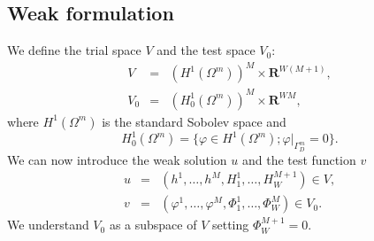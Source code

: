 \documentclass{elsarticle}
\newcommand{\R}{\mathbf{R}}
\begin{document}
\subsection{Weak formulation}
We define the trial space $V$ and the test space $V_0$:
\begin{eqnarray} \label{eqn:spaces}
  V &=& \left(H^1(\Omega^m)\right)^M\times\R^{W(M+1)}, \\
  V_0 &=& \left(H^1_0(\Omega^m)\right)^M\times\R^{WM},
\end{eqnarray}
where $H^1(\Omega^m)$ is the standard Sobolev space and 
\[ H^1_0(\Omega^m)=\{\varphi\in H^1(\Omega^m); \varphi|_{\Gamma^m_D}=0\}. \]
We can now introduce the weak solution $u$ and the test function $v$
\begin{eqnarray} \label{eqn:solution}
   u &=& (h^1,\ldots, h^M, H^1_1,\ldots,H^{M+1}_W)\in V, \\
   v &=& (\varphi^1,\ldots, \varphi^M, \Phi^1_1,\ldots,\Phi^M_W)\in V_0.
\end{eqnarray}
We understand $V_0$ as a subspace of $V$ setting $\Phi^{M+1}_W=0$.
\end{document}
